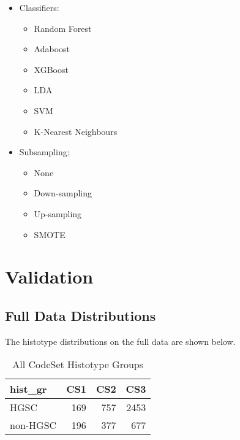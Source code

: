 \documentclass[
]{report}
\providecommand{\tightlist}{%
  \setlength{\itemsep}{0pt}\setlength{\parskip}{0pt}}
\begin{document}
\begin{itemize}
\item
  Classifiers:

  \begin{itemize}
  \tightlist
  \item
    Random Forest
  \item
    Adaboost
  \item
    XGBoost
  \item
    LDA
  \item
    SVM
  \item
    K-Nearest Neighbours
  \end{itemize}
\item
  Subsampling:

  \begin{itemize}
  \tightlist
  \item
    None
  \item
    Down-sampling
  \item
    Up-sampling
  \item
    SMOTE
  \end{itemize}
\end{itemize}

\hypertarget{validation}{%
\chapter{Validation}\label{validation}}

\hypertarget{full-data-distributions}{%
\section{Full Data Distributions}\label{full-data-distributions}}

The histotype distributions on the full data are shown below.

\begin{table}

\caption{\label{tab:dist-all-gr}All CodeSet Histotype Groups}
\centering
\begin{tabular}[t]{l|r|r|r}
\hline
hist\_gr & CS1 & CS2 & CS3\\
\hline
HGSC & 169 & 757 & 2453\\
\hline
non-HGSC & 196 & 377 & 677\\
\hline
\end{tabular}
\end{table}
\end{document}
